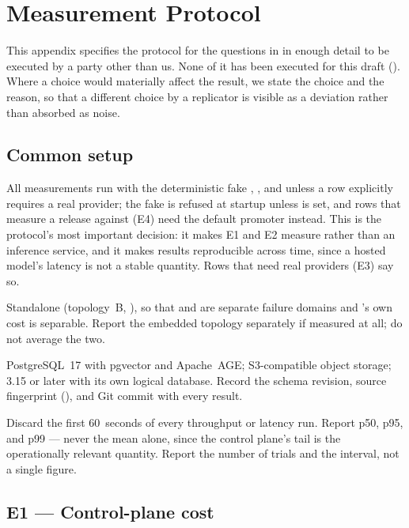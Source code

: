 \section{Measurement Protocol}
\label{app:protocol}

This appendix specifies the protocol for the questions in  in
enough detail to be executed by a party other than us. None of it has been executed
for this draft (). Where a choice would materially affect the
result, we state the choice and the reason, so that a different choice by a
replicator is visible as a deviation rather than absorbed as noise.

\subsection{Common setup}

 All measurements run with the deterministic fake
, , and  unless a row explicitly
requires a real provider; the fake  is refused at startup unless
 is set, and rows that measure a release
against \mlflow{} (E4) need the default \mlflow{} promoter instead. This is the protocol's most important decision: it makes
E1 and E2 measure \sys rather than an inference service, and it makes results
reproducible across time, since a hosted model's latency is not a stable quantity.
Rows that need real providers (E3) say so.

 Standalone (topology~B, ), so that \sys and
\mlflow{} are separate failure domains and \sys's own cost is separable. Report the
embedded topology separately if measured at all; do not average the two.

 PostgreSQL~17 with pgvector and Apache~AGE; S3-compatible
object storage; \mlflow{} 3.15 or later with its own logical database. Record the
schema revision, source fingerprint (\code{\statSourceHash}), and Git commit with every result.

 Discard the first 60~seconds of every throughput or
latency run. Report p50, p95, and p99 --- never the mean alone, since the control
plane's tail is the operationally relevant quantity. Report the number of trials and
the interval, not a single figure.

\subsection{E1 --- Control-plane cost}

